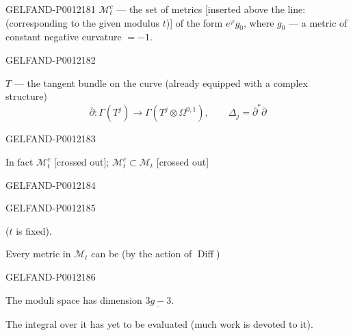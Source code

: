 \begin{GelfandAdjacentEvidence}{GELFAND-P001218}{1}
\(\mathcal M_t^c\) --- the set of metrics [inserted above the line: (corresponding to the given modulus \(t\))] of the form \(e^\varphi g_0\),
where \(g_0\) --- a metric of constant negative curvature \(=-1\).
\end{GelfandAdjacentEvidence}
\begin{GelfandAdjacentEvidence}{GELFAND-P001218}{2}


\(T\) --- the tangent bundle on the curve (already equipped with a complex structure)
\[
\bar\partial:\Gamma(T^j)\longrightarrow\Gamma(T^j\otimes\Omega^{0,1}),
\qquad\Delta_j=\bar\partial^*\bar\partial
\]
\end{GelfandAdjacentEvidence}
\begin{GelfandAdjacentEvidence}{GELFAND-P001218}{3}


In fact \(\mathcal M_t^c\) [crossed out]; \(\mathcal M_t^c\subset\mathcal M_t\)
[crossed out]
\end{GelfandAdjacentEvidence}
\begin{GelfandAdjacentEvidence}{GELFAND-P001218}{4}

\end{GelfandAdjacentEvidence}
\begin{GelfandAdjacentEvidence}{GELFAND-P001218}{5}


(\(t\) is fixed).

Every metric in \(\mathcal M_t\) can be (by the action of \(\operatorname{Diff}\))
\end{GelfandAdjacentEvidence}
\begin{GelfandAdjacentEvidence}{GELFAND-P001218}{6}


The moduli space has dimension \(\underline{3g-3}\).

The integral over it has yet to be evaluated (much work is devoted to it).

\end{GelfandAdjacentEvidence}
